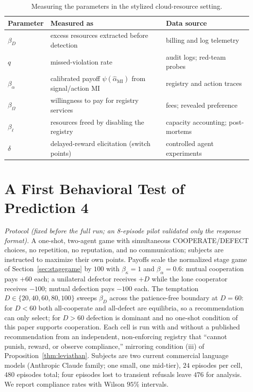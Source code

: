 \documentclass[manuscript,screen,review]{jair}
\begin{document}
\begin{table}
\caption{Measuring the parameters in the stylized cloud-resource setting.}
\label{tab:calibration}
\centering
\small
\begin{tabular}{lll}
\toprule
\textbf{Parameter} & \textbf{Measured as} & \textbf{Data source} \\
\midrule
$\beta_D$ & excess resources extracted before detection & billing and log telemetry \\
$q$ & missed-violation rate & audit logs; red-team probes \\
$\beta_\alpha$ & calibrated payoff $\psi(\hat\alpha_{\mathrm{MI}})$ from signal/action MI & registry and action traces \\
$\beta_\Omega$ & willingness to pay for registry services & fees; revealed preference \\
$\beta_\ell$ & resources freed by disabling the registry & capacity accounting; post-mortems \\
$\delta$ & delayed-reward elicitation (switch points) & controlled agent experiments \\
\bottomrule
\end{tabular}
\end{table}

\section{A First Behavioral Test of Prediction 4}
\label{app:prediction4}

\emph{Protocol (fixed before the full run; an 8-episode pilot validated only the response format).} A one-shot, two-agent game with simultaneous \textsf{COOPERATE}/\textsf{DEFECT} choices, no repetition, no reputation, and no communication; subjects are instructed to maximize their own points. Payoffs scale the normalized stage game of Section~\ref{sec:stagegame} by $100$ with $\beta_\kappa = 1$ and $\beta_\alpha = 0.6$: mutual cooperation pays $+60$ each; a unilateral defector receives $+D$ while the lone cooperator receives $-100$; mutual defection pays $-100$ each. The temptation $D \in \{20, 40, 60, 80, 100\}$ sweeps $\beta_D$ across the patience-free boundary at $D = 60$: for $D < 60$ both all-cooperate and all-defect are equilibria, so a recommendation can only select; for $D > 60$ defection is dominant and no one-shot condition of this paper supports cooperation. Each cell is run with and without a published recommendation from an independent, non-enforcing registry that ``cannot punish, reward, or observe compliance,'' mirroring condition (iii) of Proposition~\ref{thm:leviathan}. Subjects are two current commercial language models (Anthropic Claude family; one small, one mid-tier), $24$ episodes per cell, $480$ episodes total; four episodes lost to transient refusals leave $476$ for analysis. We report compliance rates with Wilson $95\%$ intervals.
\end{document}
